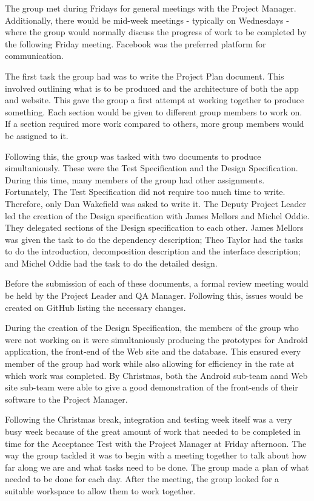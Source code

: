 \documentclass{project}
\begin{document}
The group met during Fridays for general meetings with the Project Manager. Additionally, there would be mid-week meetings - typically on Wednesdays - where the group would normally discuss the progress of work to be completed by the following Friday meeting. Facebook was the preferred platform for communication.

The first task the group had was to write the Project Plan document. This involved outlining what is to be produced and the architecture of both the app and website. This gave the group a first attempt at working together to produce something. Each section would be given to different group members to work on. If a section required more work compared to others, more group members would be assigned to it.

Following this, the group was tasked with two documents to produce simultaniously. These were the Test Specification and the Design Specification. During this time, many members of the group had other assignments. Fortunately, The Test Specification did not require too much time to write. Therefore, only Dan Wakeﬁeld was asked to write it. The Deputy Project Leader led the creation of the Design specification with James Mellors and Michel Oddie. They delegated sections of the Design specification to each other. James Mellors was given the task to do the dependency description; Theo Taylor had the tasks to do the introduction, decomposition description and the interface description; and Michel Oddie had the task to do the detailed design.

Before the submission of each of these documents, a formal review meeting would be held by the Project Leader and QA Manager. Following this, issues would be created on GitHub listing the necessary changes.

During the creation of the Design Specification, the members of the group who were not working on it were simultaniously producing the prototypes for Android application, the front-end of the Web site and the database. This ensured every member of the group had work while also allowing for efficiency in the rate at which work was completed. By Christmas, both the Android sub-team aand Web site sub-team were able to give a good demonstration of the front-ends of their software to the Project Manager.

Following the Christmas break, integration and testing week itself was a very busy week because of the great amount of work that needed to be completed in time for the Acceptance Test with the Project Manager at Friday afternoon. The way the group tackled it was to begin with a meeting together to talk about how far along we are and what tasks need to be done. The group made a plan of what needed to be done for each day. After the meeting, the group looked for a suitable workspace to allow them to work together.
\end{document}
